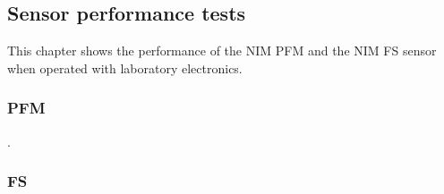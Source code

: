 	
		
	\subsection{Sensor performance tests}
		This chapter shows the performance of the NIM PFM and the NIM FS sensor when operated with laboratory electronics.
		
		\subsubsection{PFM}
		.
		\subsubsection{FS }
	
